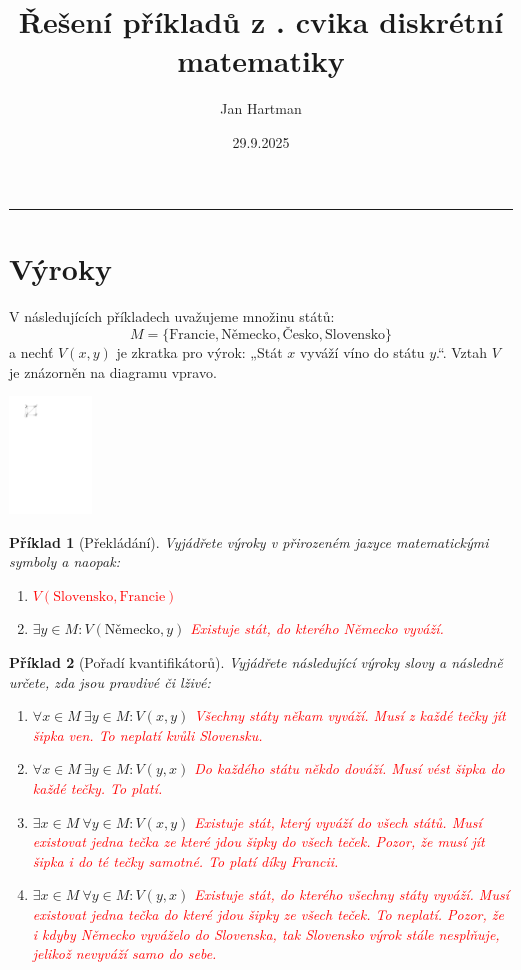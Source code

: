 \documentclass[10pt]{article}
\title{Řešení příkladů z \tutnum. cvika diskrétní matematiky}
\author{Jan Hartman}
\date{29.9.2025}
\newcommand{\titlerule}{%
    \noindent %
    \makebox[\textwidth]{\large \thetitle \hfill \thedate}
    \rule{\textwidth}{0.4pt}%
}
\theoremstyle{definitionstyle}
\theoremstyle{problemstyle}
\newtheorem{problem}{Příklad}
\begin{document}
\titlerule

\section{Výroky}

\begin{minipage}{0.7\textwidth}
V následujících příkladech uvažujeme množinu států: $$M = \{ \text{Francie}, \text{Německo}, \text{Česko}, \text{Slovensko} \}$$ a nechť $V(x,y)$ je zkratka pro výrok: „Stát $x$ vyváží víno do státu $y$.“. Vztah $V$ je znázorněn na diagramu vpravo.
\end{minipage}%
\hfill
\begin{minipage}{0.15\textwidth}
  \centering
  \includegraphics[width=2.2cm]{states.pdf}
\end{minipage}

\begin{problem}[Překládání]
Vyjádřete výroky v přirozeném jazyce matematickými symboly a naopak:
\begin{enumerate}[label=(\alph*)]
    \item {} \textcolor{red}{$V(\text{Slovensko},\text{Francie})$}
    \item $\exists y \in M : V(\text{Německo},y)$ \textcolor{red}{Existuje stát, do kterého Německo vyváží.}
\end{enumerate}
\end{problem}

\begin{problem}[Pořadí kvantifikátorů]
Vyjádřete následující výroky slovy a následně určete, zda jsou pravdivé či lživé:
\begin{enumerate}[label=(\alph*)]
    \item $\forall x \in M \ \exists y \in M : V(x,y)$ 
    \textcolor{red}{Všechny státy někam vyváží. Musí z každé tečky jít šipka ven. To neplatí kvůli Slovensku.}
    \item $\forall x \in M \ \exists y \in M : V(y,x)$
    \textcolor{red}{Do každého státu někdo dováží. Musí vést šipka do každé tečky. To platí.}
    \item $\exists x \in M \ \forall y \in M : V(x,y)$
    \textcolor{red}{Existuje stát, který vyváží do všech států. Musí existovat jedna tečka ze které jdou šipky do všech teček. Pozor, že musí jít šipka i do té tečky samotné. To platí díky Francii.}
    \item $\exists x \in M \ \forall y \in M : V(y,x)$
    \textcolor{red}{Existuje stát, do kterého všechny státy vyváží. Musí existovat jedna tečka do které jdou šipky ze všech teček. To neplatí. Pozor, že i kdyby Německo vyváželo do Slovenska, tak Slovensko výrok stále nesplňuje, jelikož nevyváží samo do sebe.}
\end{enumerate}

\end{problem}
\end{document}
